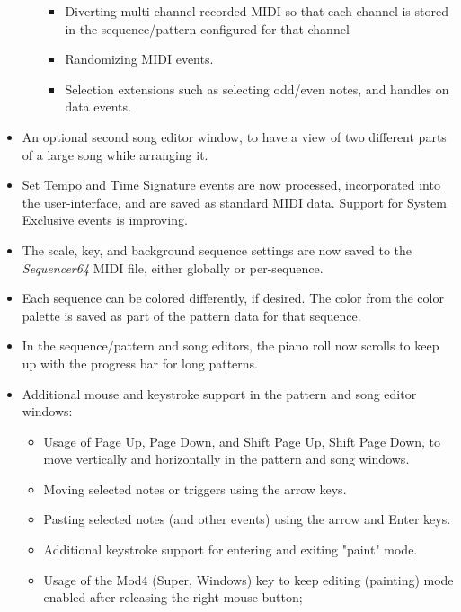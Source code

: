 \documentclass[
 11pt,
 twoside,
 a4paper,
 headinclude,
 footinclude,
 final                                 %
]{article}
\begin{document}
\begin{itemize}
\begin{itemize}
\begin{itemize}
               \item Diverting multi-channel recorded MIDI so that each channel
                  is stored in the sequence/pattern configured for that channel
               \item Randomizing MIDI events.
               \item Selection extensions such as selecting odd/even notes, and
                  handles on data events.
            \end{itemize}
         \end{itemize}
      \item An optional second song editor window, to have a view
         of two different parts of a large song while arranging it.
      \item Set Tempo and Time Signature events are
         now processed, incorporated into the user-interface, and are saved
         as standard MIDI data.  Support for System Exclusive events is
         improving.
      \item The scale, key, and background sequence
         settings are now saved to the \textsl{Sequencer64} MIDI file, either
         globally or per-sequence.
      \item Each sequence can be colored differently, if desired.  The color
         from the color palette is saved as part of the pattern data for that
         sequence.
      \item In the sequence/pattern and song editors, the piano roll
         now scrolls to keep up with the progress bar for long patterns.
      \item Additional mouse and keystroke support in the pattern and song
         editor windows:
      \begin{itemize}
         \item Usage of Page Up, Page Down, and Shift Page Up, Shift Page Down,
            to move vertically and horizontally in the pattern and song
            windows.
         \item Moving selected notes or triggers using the arrow keys.
         \item Pasting selected notes (and other events) using the arrow and
            Enter keys.
         \item Additional keystroke support for entering and exiting "paint"
            mode.
         \item Usage of the Mod4 (Super, Windows) key to keep editing
            (painting) mode enabled after releasing the right mouse button;

\end{itemize}
\end{itemize}
\end{document}
